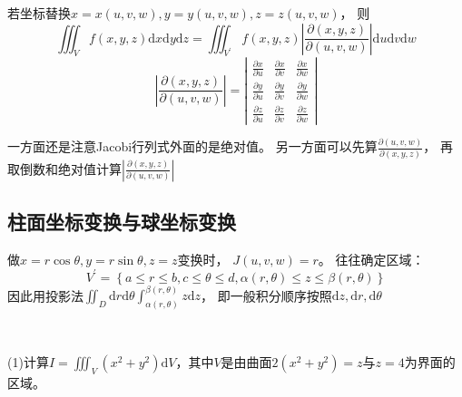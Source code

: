 \begin{theorem}[三重积分换元]
  若坐标替换$x = x(u,v,w),y = y(u,v,w),z = z(u,v,w)$，
  则
  \begin{equation*}
    \iiint _V f(x,y,z) \mathrm{d}x\mathrm{d}y\mathrm{d}z = \iiint_{V^{\prime}}f(x,y,z)\left|\frac{\partial (x,y,z)}{\partial(u,v,w)}\right|\mathrm{d}u\mathrm{d}v\mathrm{d}w
  \end{equation*}
  \begin{equation*}
    \left|\frac{\partial(x,y,z)}{\partial(u,v,w)}\right| = \left|
      \begin{array}{ccc}
        \frac{\partial x}{\partial u}&\frac{\partial x}{\partial v}&\frac{\partial x}{\partial w}\\
        \frac{\partial y}{\partial u}&\frac{\partial y}{\partial v}&\frac{\partial y}{\partial w} \\
                                     \frac{\partial z}{\partial u}&\frac{\partial z}{\partial v}&\frac{\partial z}{\partial w}
      \end{array}
    \right|
  \end{equation*}
\end{theorem}

\begin{note}
  一方面还是注意Jacobi行列式外面的是绝对值。
  另一方面可以先算$\frac{\partial(u,v,w)}{\partial(x,y,z)}$，
  再取倒数和绝对值计算$\left|\frac{\partial(x,y,z)}{\partial(u,v,w)}\right|$
\end{note}

\subsection{柱面坐标变换与球坐标变换}

\begin{theorem}[柱面变换]
  做$x = r\cos \theta, y = r\sin \theta, z = z$变换时，
  $J(u,v,w) = r$。
  往往确定区域：
  \begin{equation*}
    V^{\prime} = \left\{ a \leq r \leq b, c \leq \theta \leq d, \alpha(r,\theta) \leq z \leq \beta(r,\theta) \right\}
  \end{equation*}
  因此用投影法$\iint _D \mathrm{d} r \mathrm{d} \theta \int_{\alpha(r,\theta)}^{\beta(r,\theta)} z\mathrm{d} z$，
  即一般积分顺序按照$\mathrm{d}z,\mathrm{d}r, \mathrm{d}\theta$
\end{theorem}

~

\begin{exercise}[柱坐标变换]
  (1)计算$I = \iiint_V (x^2 + y^2)\mathrm{d}V$，其中$V$是由曲面$2(x^2 + y^2) = z$与$z = 4$为界面的区域。
\end{exercise}

